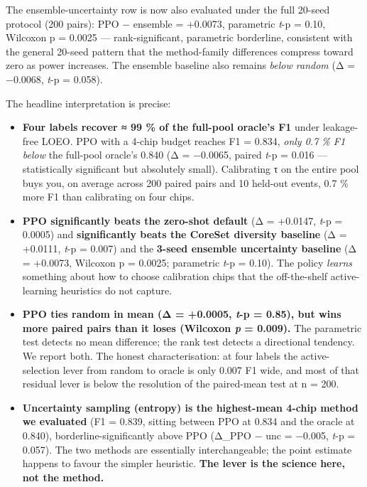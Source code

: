 The ensemble-uncertainty row is now also evaluated under the full
20-seed protocol (200 pairs): PPO − ensemble = +0.0073, parametric
\emph{t}-p = 0.10, Wilcoxon p = 0.0025 --- rank-significant, parametric
borderline, consistent with the general 20-seed pattern that the
method-family differences compress toward zero as power increases.
The ensemble baseline also remains \emph{below random} (Δ = −0.0068,
\emph{t}-p = 0.058).

The headline interpretation is precise:

\begin{itemize}
\tightlist
\item
  \textbf{Four labels recover ≈ 99 \% of the full-pool oracle's F1} under
  leakage-free LOEO. PPO with a 4-chip budget reaches F1 = 0.834,
  \emph{only 0.7 \% F1 below} the full-pool oracle's 0.840 (Δ = −0.0065,
  paired \emph{t}-p = 0.016 --- statistically significant but absolutely
  small). Calibrating τ on the entire pool buys you, on average across
  200 paired pairs and 10 held-out events, 0.7 \% more F1 than calibrating
  on four chips.
\item
  \textbf{PPO significantly beats the zero-shot default} (Δ = +0.0147,
  \emph{t}-p = 0.0005) and \textbf{significantly beats the CoreSet diversity
  baseline} (Δ = +0.0111, \emph{t}-p = 0.007) and the \textbf{3-seed ensemble
  uncertainty baseline} (Δ = +0.0073, Wilcoxon p = 0.0025;
  parametric \emph{t}-p = 0.10). The policy
  \emph{learns} something about how to choose calibration chips that the
  off-the-shelf active-learning heuristics do not capture.
\item
  \textbf{PPO ties random in mean (Δ = +0.0005, \emph{t}-p = 0.85), but wins more
  paired pairs than it loses (Wilcoxon \emph{p} = 0.009).} The parametric
  test detects no mean difference; the rank test detects a directional
  tendency. We report both. The honest characterisation: at four labels
  the active-selection lever from random to oracle is only 0.007 F1
  wide, and most of that residual lever is below the resolution of the
  paired-mean test at n = 200.
\item
  \textbf{Uncertainty sampling (entropy) is the highest-mean 4-chip method we
  evaluated} (F1 = 0.839, sitting between PPO at 0.834 and the oracle
  at 0.840), borderline-significantly above PPO (Δ\_PPO − unc = −0.005,
  \emph{t}-p = 0.057). The two methods are essentially interchangeable; the
  point estimate happens to favour the simpler heuristic. \textbf{The lever
  is the science here, not the method.}
\end{itemize}


